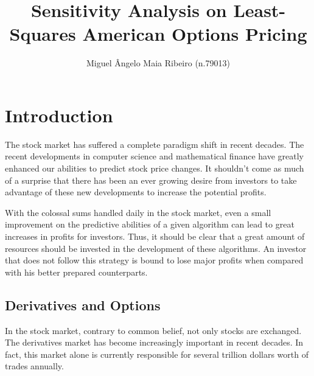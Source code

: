 \documentclass[a4paper,prd,twocolumn,nofootinbib,superscriptaddress,floatfix]{revtex4}
\begin{document}
\title{Sensitivity Analysis on Least-Squares American Options Pricing}

\author{Miguel Ângelo Maia Ribeiro (n.79013)}




\maketitle
\section{Introduction}
The stock market has suffered a complete paradigm shift in recent decades. The recent developments in computer science and mathematical finance have greatly enhanced our abilities to predict stock price changes. It shouldn't come as much of a surprise that there has been an ever growing desire from investors to take advantage of these new developments to increase the potential profits.

With the colossal sums handled daily in the stock market, even a small improvement on the predictive abilities of a given algorithm can lead to great increases in profits for investors. Thus, it should be clear that a great amount of resources should be invested in the development of these algorithms. An investor that does not follow this strategy is bound to lose major profits when compared with his better prepared counterparts.

\subsection{Derivatives and Options}
In the stock market, contrary to common belief, not only stocks are exchanged. The derivatives market has become increasingly important in recent decades. In fact, this market alone is currently responsible for several trillion dollars worth of trades annually.
\end{document}
